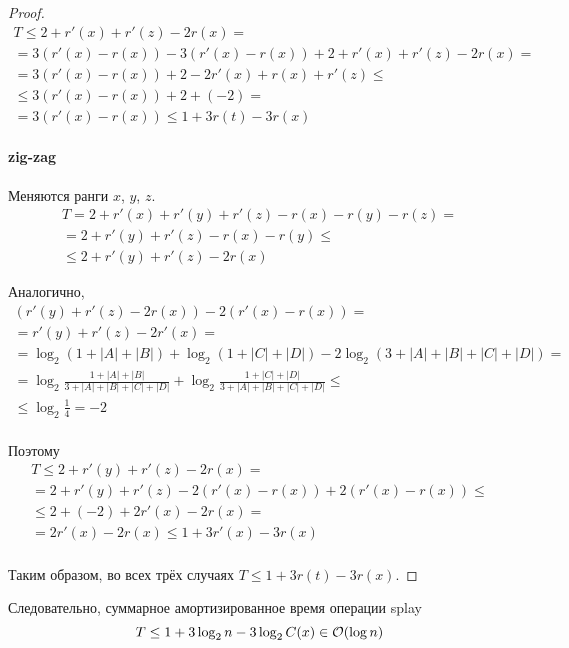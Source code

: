 \begin{proof}
    \begin{gather*}
        T \leq 2 + r'(x) + r'(z) - 2r(x) = \\
        = 3 (r'(x) - r(x)) - 3 (r'(x) - r(x)) + 2 + r'(x) + r'(z) - 2r(x) = \\
        = 3 (r'(x) - r(x)) + 2 - 2 r'(x) + r(x) + r'(z) \leq \\
        \leq 3 (r'(x) - r(x)) + 2 + (-2) = \\
        = 3 (r'(x) - r(x)) \leq 1 + 3 r(t) - 3 r(x)
    \end{gather*}

    \paragraph{zig-zag}
    Меняются ранги $x$, $y$, $z$.
    \begin{gather*}
        T = 2 + r'(x) + r'(y) + r'(z) - r(x) - r(y) - r(z) = \\
        = 2 + r'(y) + r'(z) - r(x) - r(y) \leq \\
        \leq 2 + r'(y) + r'(z) - 2 r(x)
    \end{gather*}

    Аналогично,
    \begin{gather*}
        (r'(y) + r'(z) - 2 r(x)) - 2 (r'(x) - r(x)) = \\
        = r'(y) + r'(z) - 2 r'(x) = \\
        = \log_2 (1 + |A| + |B|) + \log_2 (1 + |C| + |D|)
        - 2 \log_2 (3 + |A| + |B| + |C| + |D|) = \\
        = \log_2 \frac{1 + |A| + |B|}{3 + |A| + |B| + |C| + |D|}
        + \log_2 \frac{1 + |C| + |D|}{3 + |A| + |B| + |C| + |D|} \leq \\
        \leq \log_2 \frac{1}{4} = -2 \\
    \end{gather*}

    Поэтому
    \begin{gather*}
        T \leq 2 + r'(y) + r'(z) - 2 r(x) = \\
        = 2 + r'(y) + r'(z) - 2 (r'(x) - r(x)) + 2 (r'(x) - r(x)) \leq \\
        \leq 2 + (-2) + 2 r'(x) - 2 r(x) = \\
        = 2 r'(x) - 2 r(x) \leq 1 + 3 r'(x) - 3 r(x) \\
    \end{gather*}

    Таким образом, во всех трёх случаях
    $T \leq 1 + 3 r(t) - 3 r(x)$.
\end{proof}

Следовательно, суммарное амортизированное время операции splay
\[ T \leq 1 + 3 \log_2 n - 3 \log_2 C(x) \in \mathcal{O}(\log n) \]
